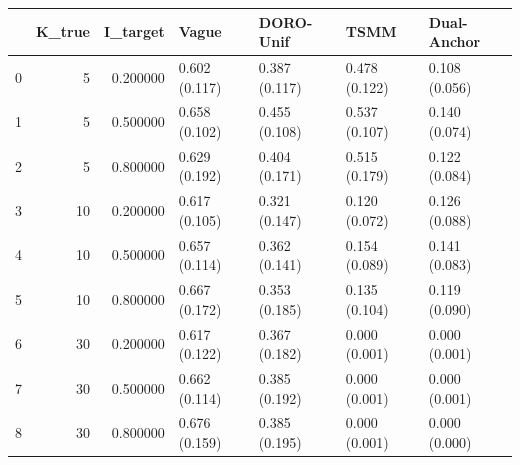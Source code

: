 \begin{tabular}{lrrllll}
\toprule
 & K_true & I_target & Vague & DORO-Unif & TSMM & Dual-Anchor \\
\midrule
0 & 5 & 0.200000 & 0.602 (0.117) & 0.387 (0.117) & 0.478 (0.122) & 0.108 (0.056) \\
1 & 5 & 0.500000 & 0.658 (0.102) & 0.455 (0.108) & 0.537 (0.107) & 0.140 (0.074) \\
2 & 5 & 0.800000 & 0.629 (0.192) & 0.404 (0.171) & 0.515 (0.179) & 0.122 (0.084) \\
3 & 10 & 0.200000 & 0.617 (0.105) & 0.321 (0.147) & 0.120 (0.072) & 0.126 (0.088) \\
4 & 10 & 0.500000 & 0.657 (0.114) & 0.362 (0.141) & 0.154 (0.089) & 0.141 (0.083) \\
5 & 10 & 0.800000 & 0.667 (0.172) & 0.353 (0.185) & 0.135 (0.104) & 0.119 (0.090) \\
6 & 30 & 0.200000 & 0.617 (0.122) & 0.367 (0.182) & 0.000 (0.001) & 0.000 (0.001) \\
7 & 30 & 0.500000 & 0.662 (0.114) & 0.385 (0.192) & 0.000 (0.001) & 0.000 (0.001) \\
8 & 30 & 0.800000 & 0.676 (0.159) & 0.385 (0.195) & 0.000 (0.001) & 0.000 (0.000) \\
\bottomrule
\end{tabular}

